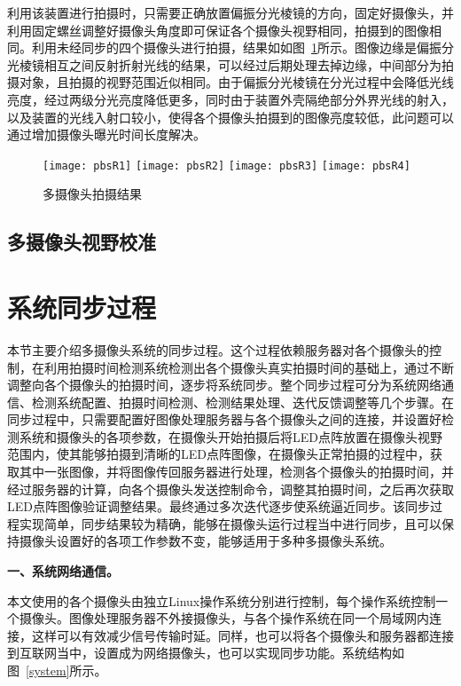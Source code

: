 利用该装置进行拍摄时，只需要正确放置偏振分光棱镜的方向，固定好摄像头，并利用固定螺丝调整好摄像头角度即可保证各个摄像头视野相同，拍摄到的图像相同。利用未经同步的四个摄像头进行拍摄，结果如如图~\ref{pbsR}所示。图像边缘是偏振分光棱镜相互之间反射折射光线的结果，可以经过后期处理去掉边缘，中间部分为拍摄对象，且拍摄的视野范围近似相同。由于偏振分光棱镜在分光过程中会降低光线亮度，经过两级分光亮度降低更多，同时由于装置外壳隔绝部分外界光线的射入，以及装置的光线入射口较小，使得各个摄像头拍摄到的图像亮度较低，此问题可以通过增加摄像头曝光时间长度解决。

\begin{figure}[h]
  \centering%
    {\texttt{[image: pbsR1]}}
      {\texttt{[image: pbsR2]}}
      {\texttt{[image: pbsR3]}}
      {\texttt{[image: pbsR4]}}
  \caption{多摄像头拍摄结果}
  \label{pbsR}
\end{figure}

\subsection{多摄像头视野校准}

\section{系统同步过程}

本节主要介绍多摄像头系统的同步过程。这个过程依赖服务器对各个摄像头的控制，在利用拍摄时间检测系统检测出各个摄像头真实拍摄时间的基础上，通过不断调整向各个摄像头的拍摄时间，逐步将系统同步。整个同步过程可分为系统网络通信、检测系统配置、拍摄时间检测、检测结果处理、迭代反馈调整等几个步骤。在同步过程中，只需要配置好图像处理服务器与各个摄像头之间的连接，并设置好检测系统和摄像头的各项参数，在摄像头开始拍摄后将LED点阵放置在摄像头视野范围内，使其能够拍摄到清晰的LED点阵图像，在摄像头正常拍摄的过程中，获取其中一张图像，并将图像传回服务器进行处理，检测各个摄像头的拍摄时间，并经过服务器的计算，向各个摄像头发送控制命令，调整其拍摄时间，之后再次获取LED点阵图像验证调整结果。最终通过多次迭代逐步使系统逼近同步。该同步过程实现简单，同步结果较为精确，能够在摄像头运行过程当中进行同步，且可以保持摄像头设置好的各项工作参数不变，能够适用于多种多摄像头系统。

\textbf{一、系统网络通信。}

本文使用的各个摄像头由独立Linux操作系统分别进行控制，每个操作系统控制一个摄像头。图像处理服务器不外接摄像头，与各个操作系统在同一个局域网内连接，这样可以有效减少信号传输时延。同样，也可以将各个摄像头和服务器都连接到互联网当中，设置成为网络摄像头，也可以实现同步功能。系统结构如图~\ref{system}所示。

